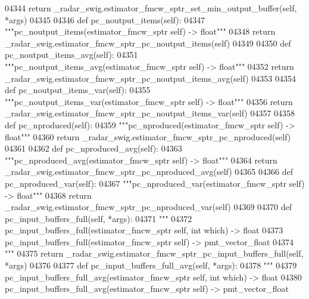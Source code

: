 \begin{DoxyCode}
{{{{{{{{{{{{{{{04344         \textcolor{keywordflow}{return} \_radar\_swig.estimator\_fmcw\_sptr\_set\_min\_output\_buffer(self, *args)
04345 
04346     \textcolor{keyword}{def }pc_noutput_items(self):
04347         \textcolor{stringliteral}{"""pc\_noutput\_items(estimator\_fmcw\_sptr self) -> float"""}
04348         \textcolor{keywordflow}{return} \_radar\_swig.estimator\_fmcw\_sptr\_pc\_noutput\_items(self)
04349 
04350     \textcolor{keyword}{def }pc_noutput_items_avg(self):
04351         \textcolor{stringliteral}{"""pc\_noutput\_items\_avg(estimator\_fmcw\_sptr self) -> float"""}
04352         \textcolor{keywordflow}{return} \_radar\_swig.estimator\_fmcw\_sptr\_pc\_noutput\_items\_avg(self)
04353 
04354     \textcolor{keyword}{def }pc_noutput_items_var(self):
04355         \textcolor{stringliteral}{"""pc\_noutput\_items\_var(estimator\_fmcw\_sptr self) -> float"""}
04356         \textcolor{keywordflow}{return} \_radar\_swig.estimator\_fmcw\_sptr\_pc\_noutput\_items\_var(self)
04357 
04358     \textcolor{keyword}{def }pc_nproduced(self):
04359         \textcolor{stringliteral}{"""pc\_nproduced(estimator\_fmcw\_sptr self) -> float"""}
04360         \textcolor{keywordflow}{return} \_radar\_swig.estimator\_fmcw\_sptr\_pc\_nproduced(self)
04361 
04362     \textcolor{keyword}{def }pc_nproduced_avg(self):
04363         \textcolor{stringliteral}{"""pc\_nproduced\_avg(estimator\_fmcw\_sptr self) -> float"""}
04364         \textcolor{keywordflow}{return} \_radar\_swig.estimator\_fmcw\_sptr\_pc\_nproduced\_avg(self)
04365 
04366     \textcolor{keyword}{def }pc_nproduced_var(self):
04367         \textcolor{stringliteral}{"""pc\_nproduced\_var(estimator\_fmcw\_sptr self) -> float"""}
04368         \textcolor{keywordflow}{return} \_radar\_swig.estimator\_fmcw\_sptr\_pc\_nproduced\_var(self)
04369 
04370     \textcolor{keyword}{def }pc_input_buffers_full(self, *args):
04371         \textcolor{stringliteral}{"""}
04372 \textcolor{stringliteral}{        pc\_input\_buffers\_full(estimator\_fmcw\_sptr self, int which) -> float}
04373 \textcolor{stringliteral}{        pc\_input\_buffers\_full(estimator\_fmcw\_sptr self) -> pmt\_vector\_float}
04374 \textcolor{stringliteral}{        """}
04375         \textcolor{keywordflow}{return} \_radar\_swig.estimator\_fmcw\_sptr\_pc\_input\_buffers\_full(self, *args)
04376 
04377     \textcolor{keyword}{def }pc_input_buffers_full_avg(self, *args):
04378         \textcolor{stringliteral}{"""}
04379 \textcolor{stringliteral}{        pc\_input\_buffers\_full\_avg(estimator\_fmcw\_sptr self, int which) -> float}
04380 \textcolor{stringliteral}{        pc\_input\_buffers\_full\_avg(estimator\_fmcw\_sptr self) -> pmt\_vector\_float}
}}}}}}}}}}}}}}}
\end{DoxyCode}
